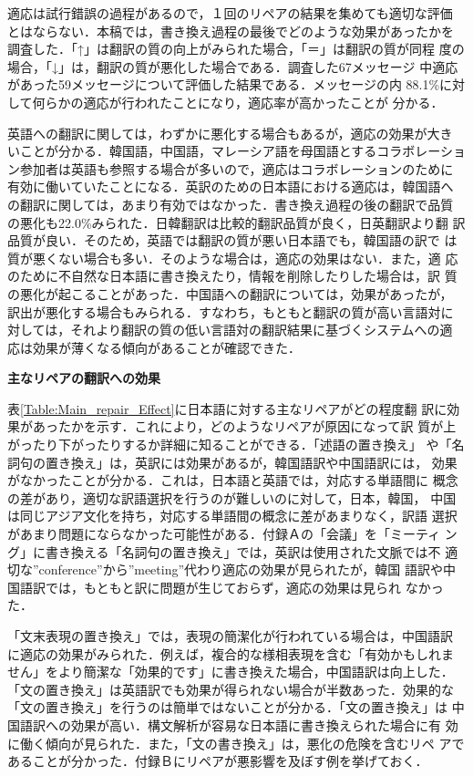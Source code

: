 適応は試行錯誤の過程があるので，１回のリペアの結果を集めても適切な評価
とはならない．本稿では，書き換え過程の最後でどのような効果があったかを
調査した．「↑」は翻訳の質の向上がみられた場合，「＝」は翻訳の質が同程
度の場合，「↓」は，翻訳の質が悪化した場合である．調査した67メッセージ
中適応があった59メッセージについて評価した結果である．メッセージの内
88.1\%に対して何らかの適応が行われたことになり，適応率が高かったことが
分かる． 

英語への翻訳に関しては，わずかに悪化する場合もあるが，適応の効果が大き
いことが分かる．韓国語，中国語，マレーシア語を母国語とするコラボレーショ
ン参加者は英語も参照する場合が多いので，適応はコラボレーションのために
有効に働いていたことになる．英訳のための日本語における適応は，韓国語へ
の翻訳に関しては，あまり有効ではなかった．書き換え過程の後の翻訳で品質
の悪化も22.0\%みられた．日韓翻訳は比較的翻訳品質が良く，日英翻訳より翻
訳品質が良い．そのため，英語では翻訳の質が悪い日本語でも，韓国語の訳で
は質が悪くない場合も多い．そのような場合は，適応の効果はない．また，適
応のために不自然な日本語に書き換えたり，情報を削除したりした場合は，訳
質の悪化が起こることがあった．中国語への翻訳については，効果があったが，
訳出が悪化する場合もみられる．すなわち，もともと翻訳の質が高い言語対に
対しては，それより翻訳の質の低い言語対の翻訳結果に基づくシステムへの適
応は効果が薄くなる傾向があることが確認できた．

{\bf 主なリペアの翻訳への効果}

表\ref{Table:Main_repair_Effect}に日本語に対する主なリペアがどの程度翻
訳に効果があったかを示す．これにより，どのようなリペアが原因になって訳
質が上がったり下がったりするか詳細に知ることができる．「述語の置き換え」
や「名詞句の置き換え」は，英訳には効果があるが，韓国語訳や中国語訳には，
効果がなかったことが分かる．これは，日本語と英語では，対応する単語間に
概念の差があり，適切な訳語選択を行うのが難しいのに対して，日本，韓国，
中国は同じアジア文化を持ち，対応する単語間の概念に差があまりなく，訳語
選択があまり問題にならなかった可能性がある．付録Ａの「会議」を「ミーティ
ング」に書き換える「名詞句の置き換え」では，英訳は使用された文脈では不
適切な''conference''から''meeting''代わり適応の効果が見られたが，韓国
語訳や中国語訳では，もともと訳に問題が生じておらず，適応の効果は見られ
なかった．

「文末表現の置き換え」では，表現の簡潔化が行われている場合は，中国語訳
に適応の効果がみられた．例えば，複合的な様相表現を含む「有効かもしれま
せん」をより簡潔な「効果的です」に書き換えた場合，中国語訳は向上した．
「文の置き換え」は英語訳でも効果が得られない場合が半数あった．効果的な
「文の置き換え」を行うのは簡単ではないことが分かる．「文の置き換え」は
中国語訳への効果が高い．構文解析が容易な日本語に書き換えられた場合に有
効に働く傾向が見られた．また，「文の書き換え」は，悪化の危険を含むリペ
アであることが分かった．付録Ｂにリペアが悪影響を及ぼす例を挙げておく．

